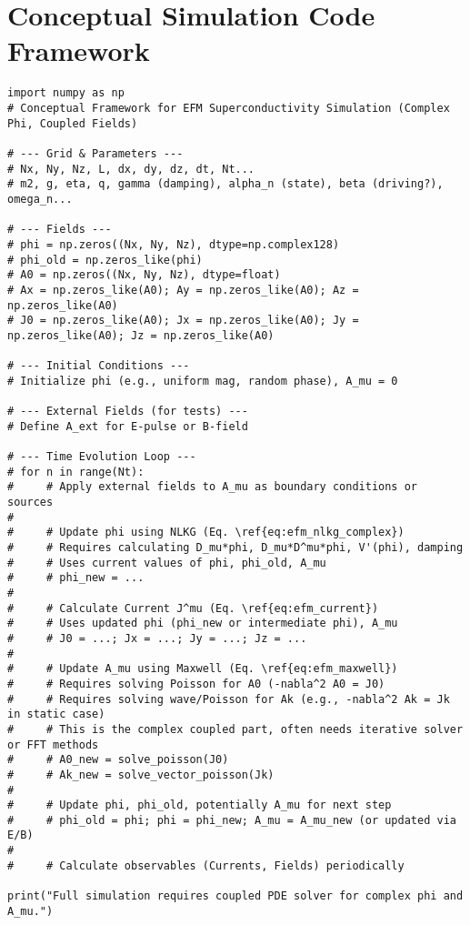 \documentclass[a4paper,12pt]{article}
\begin{document}
\section{Conceptual Simulation Code Framework}
\begin{lstlisting}
import numpy as np
# Conceptual Framework for EFM Superconductivity Simulation (Complex Phi, Coupled Fields)

# --- Grid & Parameters ---
# Nx, Ny, Nz, L, dx, dy, dz, dt, Nt...
# m2, g, eta, q, gamma (damping), alpha_n (state), beta (driving?), omega_n...

# --- Fields ---
# phi = np.zeros((Nx, Ny, Nz), dtype=np.complex128)
# phi_old = np.zeros_like(phi)
# A0 = np.zeros((Nx, Ny, Nz), dtype=float)
# Ax = np.zeros_like(A0); Ay = np.zeros_like(A0); Az = np.zeros_like(A0)
# J0 = np.zeros_like(A0); Jx = np.zeros_like(A0); Jy = np.zeros_like(A0); Jz = np.zeros_like(A0)

# --- Initial Conditions ---
# Initialize phi (e.g., uniform mag, random phase), A_mu = 0

# --- External Fields (for tests) ---
# Define A_ext for E-pulse or B-field

# --- Time Evolution Loop ---
# for n in range(Nt):
#     # Apply external fields to A_mu as boundary conditions or sources
#
#     # Update phi using NLKG (Eq. \ref{eq:efm_nlkg_complex})
#     # Requires calculating D_mu*phi, D_mu*D^mu*phi, V'(phi), damping
#     # Uses current values of phi, phi_old, A_mu
#     # phi_new = ...
#
#     # Calculate Current J^mu (Eq. \ref{eq:efm_current})
#     # Uses updated phi (phi_new or intermediate phi), A_mu
#     # J0 = ...; Jx = ...; Jy = ...; Jz = ...
#
#     # Update A_mu using Maxwell (Eq. \ref{eq:efm_maxwell})
#     # Requires solving Poisson for A0 (-nabla^2 A0 = J0)
#     # Requires solving wave/Poisson for Ak (e.g., -nabla^2 Ak = Jk in static case)
#     # This is the complex coupled part, often needs iterative solver or FFT methods
#     # A0_new = solve_poisson(J0)
#     # Ak_new = solve_vector_poisson(Jk)
#
#     # Update phi, phi_old, potentially A_mu for next step
#     # phi_old = phi; phi = phi_new; A_mu = A_mu_new (or updated via E/B)
#
#     # Calculate observables (Currents, Fields) periodically

print("Full simulation requires coupled PDE solver for complex phi and A_mu.")
\end{lstlisting}
\end{document}
